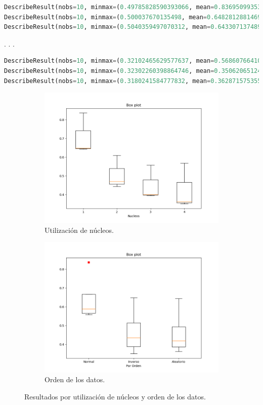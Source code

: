 \documentclass{article}
\begin{document}
\begin{lstlisting}[language=Python]
DescribeResult(nobs=10, minmax=(0.49785828590393066, mean=0.8369509935379028)
DescribeResult(nobs=10, minmax=(0.500037670135498, mean=0.6482812881469726)
DescribeResult(nobs=10, minmax=(0.5040359497070312, mean=0.6433071374893189) 
\end{lstlisting}
.
.
.
\begin{lstlisting}[language=Python]
DescribeResult(nobs=10, minmax=(0.32102465629577637, mean=0.5686076641082763)
DescribeResult(nobs=10, minmax=(0.32302260398864746, mean=0.3506206512451172)
DescribeResult(nobs=10, minmax=(0.3180241584777832, mean=0.3628715753555298)
\end{lstlisting}
\begin{figure}
	\centering
	\begin{subfigure}[b]{0.45\linewidth}
		\includegraphics[width=\linewidth]{Figure_1.png}
		\caption{Utilización de núcleos.}
		\label{32pasos}
	\end{subfigure}
		\begin{subfigure}[b]{0.45\linewidth}
		\includegraphics[width=\linewidth]{Figure_2.png}
		\caption{Orden de los datos.}
		\label{1024pasos}
	\end{subfigure}
	\caption{Resultados por utilización de núcleos y orden de los datos.}  		
\end{figure}
\end{document}
